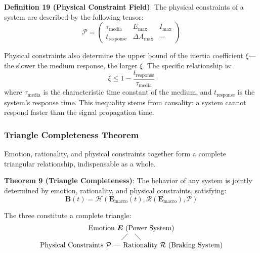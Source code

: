 \documentclass[12pt,a4paper]{article}
\theoremstyle{plain}
\newcommand{\ve}[1]{\bm{#1}}                    %
\newcommand{\Evec}{\ve{E}}                        %
\newcommand{\Bvec}{\ve{B}}                        %
\begin{document}
\textbf{Definition 19 (Physical Constraint Field)}: The physical constraints of a system are described by the following tensor:
\begin{equation}
\mathcal{P} = \begin{pmatrix}
\tau_{\text{media}} & E_{\text{max}} & I_{\text{max}} \\
t_{\text{response}} & \Delta A_{\text{max}} & \cdots
\end{pmatrix}
\label{eq:physics_tensor2}
\end{equation}

Physical constraints also determine the upper bound of the inertia coefficient $\xi$—the slower the medium response, the larger $\xi$. The specific relationship is:
\begin{equation}
\xi \leq 1 - \frac{t_{\text{response}}}{\tau_{\text{media}}}
\label{eq:inertia_bound2}
\end{equation}
where $\tau_{\text{media}}$ is the characteristic time constant of the medium, and $t_{\text{response}}$ is the system's response time. This inequality stems from causality: a system cannot respond faster than the signal propagation time.

\subsubsection{Triangle Completeness Theorem}

Emotion, rationality, and physical constraints together form a complete triangular relationship, indispensable as a whole.

\textbf{Theorem 9 (Triangle Completeness)}: The behavior of any system is jointly determined by emotion, rationality, and physical constraints, satisfying:
\begin{equation}
\Bvec(t) = \mathcal{H}\left( \Evec_{\text{macro}}(t), \mathcal{R}(\Evec_{\text{macro}}), \mathcal{P} \right)
\label{eq:triangle}
\end{equation}

The three constitute a complete triangle:
\begin{equation}
\begin{array}{c}
\text{Emotion } \Evec \text{ (Power System)} \\
\diagup \quad \diagdown \\
\text{Physical Constraints } \mathcal{P} \text{ --- Rationality } \mathcal{R} \text{ (Braking System)}
\end{array}
\label{eq:triangle_diagram}
\end{equation}
\end{document}
